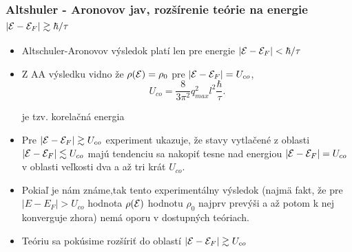 \documentclass[
	11pt, %
]{beamer}
\begin{document}
\begin{frame}
\frametitle{Altshuler - Aronovov jav, rozšírenie teórie na energie $|\mathcal{E} - \mathcal{E}_F| \gtrsim \hbar/\tau$}
\begin{itemize}
\item Altschuler-Aronovov výsledok platí len pre energie $|\mathcal{E} - \mathcal{E}_F| < \hbar/\tau$
\item Z AA výsledku vidno že $\rho(\mathcal{E}) = \rho_0$ pre $|\mathcal{E}-\mathcal{E}_F| =  U_{co}$,
\begin{equation}
\label{eq:aa_U co korelenergia}
 U_{co} = \frac{8}{3\pi^{2}} q_{max}^2 l^2 \frac{\hbar}{\tau} \text{.}
\end{equation}

je tzv. korelačná energia
\item Pre $|\mathcal{E}-\mathcal{E}_F| \gtrsim  U_{co}$ experiment ukazuje, že stavy vytlačené z oblasti $|\mathcal{E}-\mathcal{E}_F| \lesssim  U_{co}$ majú tendenciu sa nakopiť tesne
nad energiou $|\mathcal{E}-\mathcal{E}_F| =  U_{co}$ v oblasti veľkosti dva a až tri krát $U_{co}$.
\item Pokiaľ je nám známe,tak tento experimentálny výsledok (najmä fakt, že  pre $|E-E_F| > U_{co}$ hodnota $\rho(\mathcal{E})$ hodnotu $\rho_0$
najprv prevýši a až potom k nej konverguje zhora) nemá oporu v dostupných teóriach.
\item Teóriu sa pokúsime rozšíriť do oblastí  $|\mathcal{E}-\mathcal{E}_F| \gtrsim U_{co}$
\end{itemize}
\end{frame}
\end{document}
